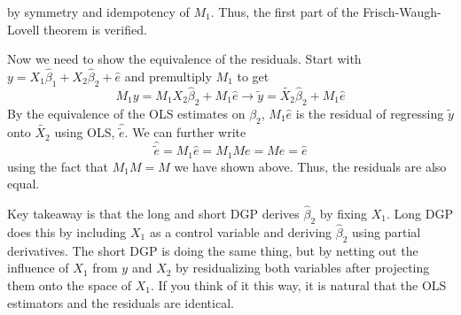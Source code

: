\documentclass[12pt]{article}
\theoremstyle{definition}
\theoremstyle{property}
\theoremstyle{assumption}
\theoremstyle{example}
\theoremstyle{comment}
\begin{document}
by symmetry and idempotency of $M_1$. Thus, the first part of the Frisch-Waugh-Lovell theorem is verified. 
\par 
Now we need to show the equivalence of the residuals. Start with $y=X_1\hat{\beta}_1+X_2\hat{\beta}_2+\hat{e}$ and premultiply $M_1$ to get
\[
M_1y = M_1 X_2\hat{\beta}_2 + M_1\hat{e} \to \widetilde{y} = \widetilde{X_2}\hat{\beta}_2 + M_1\hat{e}
\]
By the equivalence of the OLS estimates on $\beta_2$, $M_1\hat{e}$ is the residual of regressing $\widetilde{y}$ onto $\widetilde{X_2}$ using OLS, $\widehat{\widetilde{e}}$. We can further write
\[
\widehat{\widetilde{e}} = M_1\hat{e} = M_1Me = Me = \hat{e}
\]
using the fact that $M_1M=M$ we have shown above. Thus, the residuals are also equal.
\par
Key takeaway is that the long and short DGP derives $\hat{\beta}_2$ by fixing $X_1$. Long DGP does this by including $X_1$ as a control variable and deriving $\hat{\beta}_2$ using partial derivatives. The short DGP is doing the same thing, but by netting out the influence of $X_1$ from $y$ and $X_2$ by residualizing both variables after projecting them onto the space of $X_1$. If you think of it this way, it is natural that the OLS estimators and the residuals are identical. 
\end{document}
